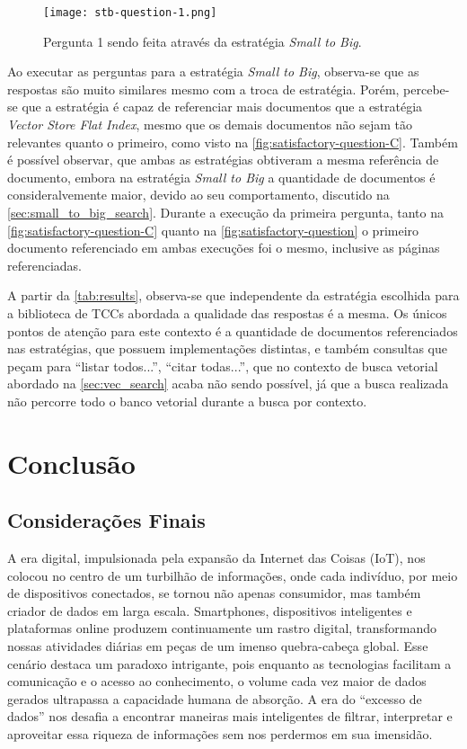 \documentclass[a4paper, 12pt]{article}
\begin{document}
    \begin{figure}[ht]
        \texttt{[image: stb-question-1.png]}
        \centering
        \caption{Pergunta 1 sendo feita através da estratégia \textit{Small to Big}.}
        \centering
        \label{fig:satisfactory-question-C}
    \end{figure}
    
    Ao executar as perguntas para a estratégia \textit{Small to Big}, observa-se que as respostas são muito similares mesmo com a troca de estratégia. Porém, percebe-se que a estratégia é capaz de referenciar mais documentos que a estratégia \textit{Vector Store Flat Index}, mesmo que os demais documentos não sejam tão relevantes quanto o primeiro, como visto na \autoref{fig:satisfactory-question-C}. Também é possível observar, que ambas as estratégias obtiveram a mesma referência de documento, embora na estratégia \textit{Small to Big} a quantidade de documentos é consideralvemente maior, devido ao seu comportamento, discutido na \autoref{sec:small_to_big_search}. Durante a execução da primeira pergunta, tanto na \autoref{fig:satisfactory-question-C} quanto na \autoref{fig:satisfactory-question} o primeiro documento referenciado em ambas execuções foi o mesmo, inclusive as páginas referenciadas.

    A partir da \autoref{tab:results}, observa-se que independente da estratégia escolhida para a biblioteca de TCCs abordada a qualidade das respostas é a mesma. Os únicos pontos de atenção para este contexto é a quantidade de documentos referenciados nas estratégias, que possuem implementações distintas, e também consultas que peçam para ``listar todos...'', ``citar todas...'', que no contexto de busca vetorial abordado na \autoref{sec:vec_search} acaba não sendo possível, já que a busca realizada não percorre todo o banco vetorial durante a busca por contexto.

    \clearpage
    
    \section{Conclusão}
    
    \subsection{Considerações Finais}

    A era digital, impulsionada pela expansão da Internet das Coisas (IoT), nos colocou no centro de um turbilhão de informações, onde cada indivíduo, por meio de dispositivos conectados, se tornou não apenas consumidor, mas também criador de dados em larga escala. Smartphones, dispositivos inteligentes e plataformas online produzem continuamente um rastro digital, transformando nossas atividades diárias em peças de um imenso quebra-cabeça global. Esse cenário destaca um paradoxo intrigante, pois enquanto as tecnologias facilitam a comunicação e o acesso ao conhecimento, o volume cada vez maior de dados gerados ultrapassa a capacidade humana de absorção. A era do ``excesso de dados'' nos desafia a encontrar maneiras mais inteligentes de filtrar, interpretar e aproveitar essa riqueza de informações sem nos perdermos em sua imensidão.
\end{document}
